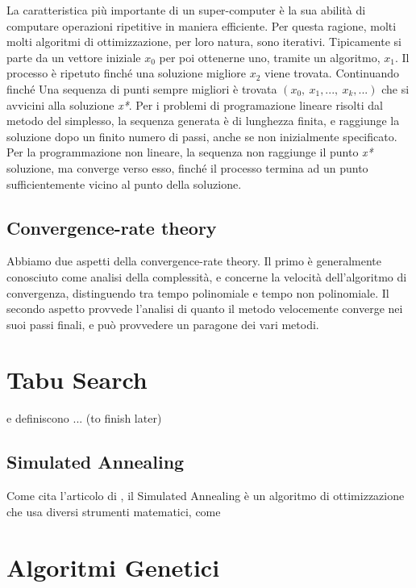 \documentclass{article}
\begin{document}
La caratteristica più importante di un super-computer è la sua abilità di
computare operazioni ripetitive in maniera efficiente. Per questa ragione,
molti molti algoritmi di ottimizzazione, per loro natura, sono iterativi.
Tipicamente si parte da un vettore iniziale \(x_0\) per poi ottenerne uno, tramite un algoritmo, \(x_1\).
Il processo è ripetuto finché una soluzione migliore \(x_2\) viene trovata. Continuando finché 
Una sequenza di punti sempre migliori è trovata \( (x_0 , \ x_1 , ..., \ x_k , ...  )\) che si avvicini 
alla soluzione \textit{x*}. Per i problemi di programazione lineare risolti dal metodo del simplesso,
la sequenza generata è di lunghezza finita, e raggiunge la soluzione dopo un finito
numero di passi, anche se non inizialmente specificato.
Per la programmazione non lineare, la sequenza non raggiunge il punto \textit{x*} soluzione, 
ma converge verso esso, finché il processo termina ad un punto sufficientemente vicino al 
punto della soluzione.

\subsection{Convergence-rate theory}

Abbiamo due aspetti della convergence-rate theory. Il primo è generalmente 
conosciuto come analisi della complessità, e concerne la velocità dell'algoritmo 
di convergenza, distinguendo tra tempo polinomiale e tempo non polinomiale.
Il secondo aspetto provvede l'analisi di quanto il metodo velocemente converge 
nei suoi passi finali, e può provvedere un paragone dei vari metodi.

\section{Tabu Search}

\textcite{TabuSearch} e \textcite{LocalSearch} definiscono  ... (to finish later)

\subsection{Simulated Annealing}

Come cita l'articolo di  \textcite{SimulatedAnnealing01}, il Simulated Annealing
è un algoritmo di ottimizzazione che usa diversi strumenti matematici, come 

\section{Algoritmi Genetici}

\printbibliography[title = {Bibliografia e crediti}]
\end{document}
